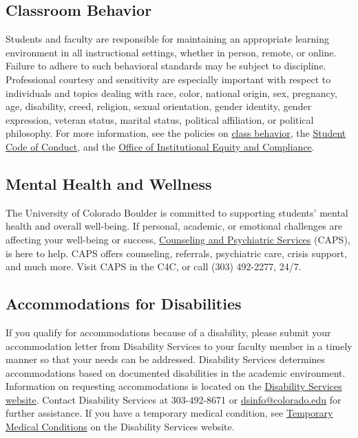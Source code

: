 \documentclass[11pt]{memoir}
\begin{document}
\subsection{Classroom Behavior}
Students and faculty are responsible for maintaining an appropriate learning environment in all instructional settings, whether in person, remote, or online. Failure to adhere to such behavioral standards may be subject to discipline. Professional courtesy and sensitivity are especially important with respect to individuals and topics dealing with race, color, national origin, sex, pregnancy, age, disability, creed, religion, sexual orientation, gender identity, gender expression, veteran status, marital status, political affiliation, or political philosophy. For more information, see the policies on \href{http://www.colorado.edu/policies/student-classroom-and-course-related-behavior}{class behavior}, the \href{http://www.colorado.edu/osc/#student_code}{Student Code of Conduct}, and the \href{https://www.colorado.edu/oiec/}{Office of Institutional Equity and Compliance}.

\subsection{Mental Health and Wellness}
The University of Colorado Boulder is committed to supporting students’ mental health and overall well-being. If personal, academic, or emotional challenges are affecting your well-being or success, \href{https://www.colorado.edu/counseling/}{Counseling and Psychiatric Services} (CAPS), is here to help. CAPS offers counseling, referrals, psychiatric care, crisis support, and much more. Visit CAPS in the C4C, or call (303) 492-2277, 24/7.

\subsection{Accommodations for Disabilities}
If you qualify for accommodations because of a disability, please submit your accommodation letter from Disability Services to your faculty member in a timely manner so that your needs can be addressed.  Disability Services determines accommodations based on documented disabilities in the academic environment.  Information on requesting accommodations is located on the \href{www.colorado.edu/disabilityservices/students}{Disability Services website}. Contact Disability Services at 303-492-8671 or \href{mailto:dsinfo@colorado.edu}{dsinfo@colorado.edu} for further assistance. If you have a temporary medical condition, see \href{http://www.colorado.edu/disabilityservices/students/temporary-medical-conditions}{Temporary Medical Conditions} on the Disability Services website.
\end{document}
